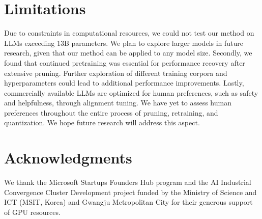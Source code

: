\section*{Limitations}
Due to constraints in computational resources, we could not test our method on LLMs exceeding 13B parameters. We plan to explore larger models in future research, given that our method can be applied to any model size. Secondly, we found that continued pretraining was essential for performance recovery after extensive pruning. Further exploration of different training corpora and hyperparameters could lead to additional performance improvements. Lastly, commercially available LLMs are optimized for human preferences, such as safety and helpfulness, through alignment tuning. We have yet to assess human preferences throughout the entire process of pruning, retraining, and quantization. We hope future research will address this aspect.

\section*{Acknowledgments}
We thank the Microsoft Startups Founders Hub program and the AI Industrial Convergence Cluster Development project funded by the Ministry of Science and ICT (MSIT, Korea) and Gwangju Metropolitan City for their generous support of GPU resources.

\clearpage

